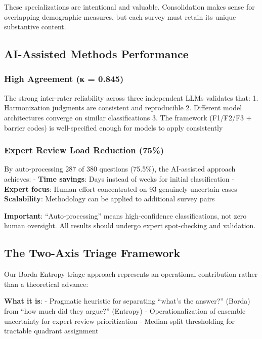 \documentclass[
  letterpaper,
]{report}
\begin{document}
These specializations are intentional and valuable. Consolidation makes
sense for overlapping demographic measures, but each survey must retain
its unique substantive content.

\subsection{AI-Assisted Methods
Performance}\label{ai-assisted-methods-performance}

\subsubsection{High Agreement (κ =
0.845)}\label{high-agreement-ux3ba-0.845}

The strong inter-rater reliability across three independent LLMs
validates that: 1. Harmonization judgments are consistent and
reproducible 2. Different model architectures converge on similar
classifications 3. The framework (F1/F2/F3 + barrier codes) is
well-specified enough for models to apply consistently

\subsubsection{Expert Review Load Reduction
(75\%)}\label{expert-review-load-reduction-75}

By auto-processing 287 of 380 questions (75.5\%), the AI-assisted
approach achieves: - \textbf{Time savings}: Days instead of weeks for
initial classification - \textbf{Expert focus}: Human effort
concentrated on 93 genuinely uncertain cases - \textbf{Scalability}:
Methodology can be applied to additional survey pairs

\textbf{Important}: ``Auto-processing'' means high-confidence
classifications, not zero human oversight. All results should undergo
expert spot-checking and validation.

\subsection{The Two-Axis Triage
Framework}\label{the-two-axis-triage-framework}

Our Borda-Entropy triage approach represents an operational contribution
rather than a theoretical advance:

\textbf{What it is}: - Pragmatic heuristic for separating ``what's the
answer?'' (Borda) from ``how much did they argue?'' (Entropy) -
Operationalization of ensemble uncertainty for expert review
prioritization - Median-split thresholding for tractable quadrant
assignment
\end{document}

